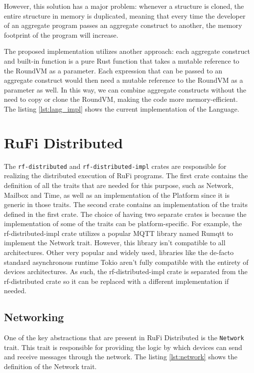 However, this solution has a major problem: whenever a structure is cloned, the entire structure in memory is duplicated, meaning that every time the developer of an aggregate program
passes an aggregate construct to another, the memory footprint of the program will increase.

The proposed implementation utilizes another approach: each aggregate construct and built-in function is a pure Rust function that takes a mutable reference to the RoundVM as a parameter.
Each expression that can be passed to an aggregate construct would then need a mutable reference to the RoundVM as a parameter as well. In this way, we can combine aggregate constructs
without the need to copy or clone the RoundVM, making the code more memory-efficient. The listing \ref{lst:lang_impl} shows the current implementation of the Language.



\section{RuFi Distributed}
The \texttt{rf-distributed} and \texttt{rf-distributed-impl} crates are responsible for realizing the distributed execution of RuFi programs. The first crate contains the definition of all the traits
that are needed for this purpose, such as Network, Mailbox and Time, as well as an implementation of the Platform since it is generic in those traits. The second crate contains an implementation of the traits
defined in the first crate. The choice of having two separate crates is because the implementation of some of the traits can be platform-specific. For example, the rf-distributed-impl crate
utilizes a popular MQTT library named Rumqtt \cite{005} to implement the Network trait. However, this library isn't compatible to all architectures. Other very popular and widely used, libraries like
the de-facto standard asynchronous runtime Tokio \cite{004} aren't fully compatible with the entirety of devices architectures. As such, the rf-distributed-impl crate is separated
from the rf-distributed crate so it can be replaced with a different implementation if needed.

\subsection{Networking}
One of the key abstractions that are present in RuFi Distributed is the \texttt{Network} trait. This trait is responsible for providing the logic by which devices can send and
receive messages through the network. The listing \ref{lst:network} shows the definition of the Network trait.

